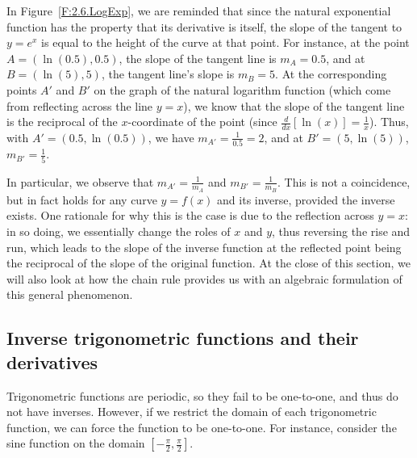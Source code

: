In Figure~\ref{F:2.6.LogExp}, we are reminded that since the natural exponential function has the property that its derivative is itself, the slope of the tangent to $y = e^x$ is equal to the height of the curve at that point.  For instance, at the point $A = (\ln(0.5), 0.5)$, the slope of the tangent line is $m_A = 0.5$, and at $B = (\ln(5), 5)$, the tangent line's slope is $m_B = 5$.  At the corresponding points $A'$ and $B'$ on the graph of the natural logarithm function (which come from reflecting across the line $y = x$), we know that the slope of the tangent line is the reciprocal of the $x$-coordinate of the point (since $\frac{d}{dx}[\ln(x)] = \frac{1}{x}$).  Thus, with $A' = (0.5, \ln(0.5))$, we have $m_{A'} = \frac{1}{0.5} = 2$, and at $B' = (5, \ln(5))$, $m_{B'} = \frac{1}{5}$.

In particular, we observe that $m_{A'} = \frac{1}{m_A}$ and $m_{B'} = \frac{1}{m_B}$.  This is not a coincidence, but in fact holds for any curve $y = f(x)$ and its inverse, provided the inverse exists.  One rationale for why this is the case is due to the reflection across $y = x$: in so doing, we essentially change the roles of $x$ and $y$, thus reversing the rise and run, which leads to the slope of the inverse function at the reflected point being the reciprocal of the slope of the original function.  At the close of this section, we will also look at how the chain rule provides us with an algebraic formulation of this general phenomenon.

\subsection*{Inverse trigonometric functions and their derivatives}

Trigonometric functions are periodic, so they fail to be one-to-one, and thus do not have inverses.  However, if we restrict the domain of each trigonometric function, we can force the function to be one-to-one.  For instance, consider the sine function on the domain $[-\frac{\pi}{2}, \frac{\pi}{2}]$.  

